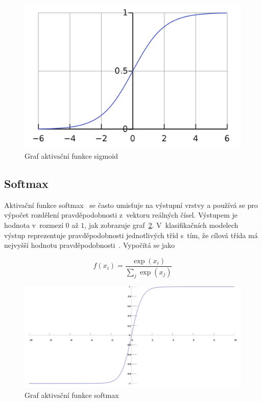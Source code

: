 \begin{figure}[H]
    \centering
    \includegraphics[scale=0.18]{obrazky-figures/sigmoid.png}
    \caption{\label{fig:sigmoid}Graf aktivační funkce sigmoid}
\end{figure}



\subsection*{Softmax}
Aktivační funkce softmax~\cite{mitdeeplearning} se často umisťuje na výstupní vrstvy a používá se pro výpočet rozdělení pravděpodobnosti z~vektoru reálných čísel. Výstupem je hodnota v~rozmezí $0$ až $1$, jak zobrazuje graf~\ref{fig:softmax}. V~klasifikačních modelech výstup reprezentuje pravděpodobnosti jednotlivých tříd s~tím, že cílová třída má nejvyšší hodnotu pravděpodobnosti~\cite{nwankpa2018activation}. Vypočítá se jako

\begin{equation}
  f(x_i) = \frac{\exp(x_i)}{\sum_j \exp(x_j)}
\end{equation}


\begin{figure}[H]
    \centering
    \includegraphics[scale=0.35]{obrazky-figures/softmax.png}
    \caption{\label{fig:softmax}Graf aktivační funkce softmax}
\end{figure}



